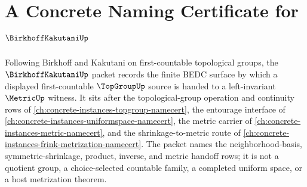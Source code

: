 \chapter{A Concrete Naming Certificate for $\BirkhoffKakutaniUp$}
\label{ch:concrete-instances-birkhoff-kakutani-namecert}

Following Birkhoff and Kakutani on first-countable topological groups, the $\BirkhoffKakutaniUp$ packet records the finite BEDC surface by which a displayed first-countable $\TopGroupUp$ source is handed to a left-invariant $\MetricUp$ witness. It sits after the topological-group operation and continuity rows of \autoref{ch:concrete-instances-topgroup-namecert}, the entourage interface of \autoref{ch:concrete-instances-uniformspace-namecert}, the metric carrier of \autoref{ch:concrete-instances-metric-namecert}, and the shrinkage-to-metric route of \autoref{ch:concrete-instances-frink-metrization-namecert}. The packet names the neighborhood-basis, symmetric-shrinkage, product, inverse, and metric handoff rows; it is not a quotient group, a choice-selected countable family, a completed uniform space, or a host metrization theorem.

